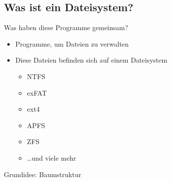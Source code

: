 \subsection{Was ist ein Dateisystem?}\label{subsec:was-ist-ein-dateisystem}

\begin{frame}
    \slidehead
    \begin{center}
        
        \hspace{2em}
        
        \hspace{2em}
        
        \hspace{2em}
        

        \vspace{1em}
        Was haben diese Programme gemeinsam?
    \end{center}

    \vspace{1ex}
    \pause
    \begin{itemize}
        [<+->]
        \item Programme, um Dateien zu verwalten
        \item Diese Dateien befinden sich auf einem Dateisystem
        \begin{itemize}
            \item NTFS
            \item exFAT
            \item ext4
            \item APFS
            \item ZFS
            \item \dots und viele mehr
        \end{itemize}
    \end{itemize}
\end{frame}

\begin{frame}
    \slidehead
    Grundidee: Baumstruktur
    \\
    \vspace{1em}
    \begin{center}
    \end{center}
\end{frame}

